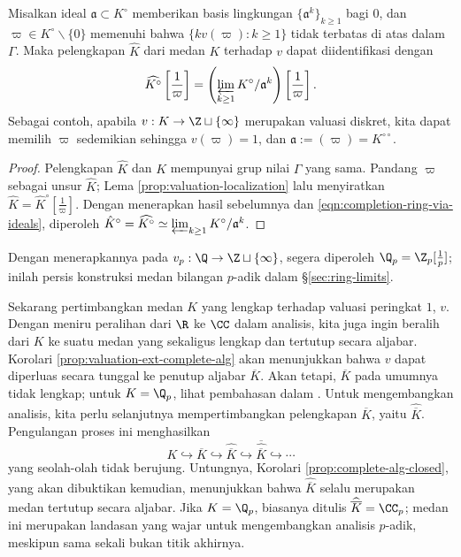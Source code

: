 \begin{proposition}\label{prop:invert-pi}
	Misalkan ideal $\mathfrak{a} \subset K^\circ$ memberikan basis lingkungan $\{ \mathfrak{a}^k \}_{k \geq 1}$ bagi $0$, dan $\varpi \in K^\circ \smallsetminus \{0\}$ memenuhi bahwa $\{kv(\varpi) : k \geq 1\}$ tidak terbatas di atas dalam $\Gamma$. Maka pelengkapan $\hat{K}$ dari medan $K$ terhadap $v$ dapat diidentifikasi dengan
	\[ \widehat{K^\circ}\left[\frac{1}{\varpi} \right] = \left( \varprojlim_{k \geq 1} K^\circ/\mathfrak{a}^k \right)\left[ \frac{1}{\varpi} \right]. \]
	Sebagai contoh, apabila $v: K \to \Z \sqcup \{\infty\}$ merupakan valuasi diskret, kita dapat memilih $\varpi$ sedemikian sehingga $v(\varpi)=1$, dan $\mathfrak{a} := (\varpi) = K^{\circ\circ}$.
\end{proposition}
\begin{proof}
	Pelengkapan $\hat{K}$ dan $K$ mempunyai grup nilai $\Gamma$ yang sama. Pandang $\varpi$ sebagai unsur $\hat{K}$; Lema \ref{prop:valuation-localization} lalu menyiratkan $\hat{K} = \hat{K}^\circ[\frac{1}{\varpi}]$. Dengan menerapkan hasil sebelumnya dan \eqref{eqn:completion-ring-via-ideals}, diperoleh $\hat{K}^\circ = \widehat{K^\circ} \simeq \varprojlim_{k \geq 1} K^\circ/\mathfrak{a}^k$.
\end{proof}

Dengan menerapkannya pada $v_p: \Q \to \Z \sqcup \{\infty\}$, segera diperoleh $\Q_p = \Z_p[\frac{1}{p}]$; inilah persis konstruksi medan bilangan $p$-adik dalam \S\ref{sec:ring-limits}.

Sekarang pertimbangkan medan $K$ yang lengkap terhadap valuasi peringkat $1$, $v$. Dengan meniru peralihan dari $\R$ ke $\CC$ dalam analisis, kita juga ingin beralih dari $K$ ke suatu medan yang sekaligus lengkap dan tertutup secara aljabar. Korolari \ref{prop:valuation-ext-complete-alg} akan menunjukkan bahwa $v$ dapat diperluas secara tunggal ke penutup aljabar $\overline{K}$. Akan tetapi, $\overline{K}$ pada umumnya tidak lengkap; untuk $K = \Q_p$, lihat pembahasan dalam \cite[Proposition 5.1]{Was97}. Untuk mengembangkan analisis, kita perlu selanjutnya mempertimbangkan pelengkapan $\overline{K}$, yaitu $\widehat{\overline{K}}$. Pengulangan proses ini menghasilkan
\[ K \hookrightarrow \overline{K} \hookrightarrow \widehat{\overline{K}} \hookrightarrow \overline{\widehat{\overline{K}}} \hookrightarrow \cdots \]
yang seolah-olah tidak berujung. Untungnya, Korolari \ref{prop:complete-alg-closed}, yang akan dibuktikan kemudian, menunjukkan bahwa $\widehat{\overline{K}}$ selalu merupakan medan tertutup secara aljabar. Jika $K = \Q_p$, biasanya ditulis $\widehat{\overline{K}} = \CC_p$; medan ini merupakan landasan yang wajar untuk mengembangkan analisis $p$-adik, meskipun sama sekali bukan titik akhirnya. 

